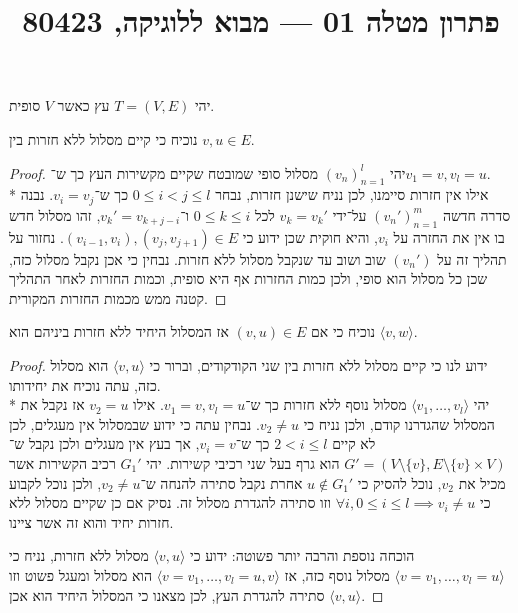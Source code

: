 
\title{פתרון מטלה 01 --- מבוא ללוגיקה, 80423}


\maketitle
\maketitleprint{}

\Question{}
יהי $T = (V, E)$ עץ כאשר $V$ סופית.

\Subquestion{}
נוכיח כי קיים מסלול ללא חזרות בין $v, u \in E$.
\begin{proof}
	יהי ${(v_n)}_{n = 1}^l$ מסלול סופי שמובטח שקיים מקשירות העץ כך ש־$v_1 = v, v_l = u$. \\*
	אילו אין חזרות סיימנו, לכן נניח שישנן חזרות, נבחר $0 \le i < j \le l$ כך ש־$v_i = v_j$.
	נבנה סדרה חדשה ${(v_n')}_{n = 1}^m$ על־ידי $v_k = v_k'$ לכל $0 \le k \le i$ ו־$v_k' = v_{k + j - i}$,
	זהו מסלול חדש בו אין את החזרה על $v_i$, והיא חוקית שכן ידוע כי $(v_{i - 1}, v_i), (v_j, v_{j + 1}) \in E$.
	נחזור על תהליך זה על $(v_n')$ שוב ושוב עד שנקבל מסלול ללא חזרות.
	נבחין כי אכן נקבל מסלול כזה, שכן כל מסלול הוא סופי, ולכן כמות החזרות אף היא סופית, וכמות החזרות לאחר התהליך קטנה ממש מכמות החזרות המקורית.
\end{proof}

\Subquestion{}
נוכיח כי אם $(v, u) \in E$ אז המסלול היחיד ללא חזרות ביניהם הוא $\langle v, w \rangle$.
\begin{proof}
	ידוע לנו כי קיים מסלול ללא חזרות בין שני הקודקודים, וברור כי $\langle v, u \rangle$ הוא מסלול כזה, עתה נוכיח את יחידותו. \\*
	יהי $\langle v_1, \dots, v_l \rangle$ מסלול נוסף ללא חזרות כך ש־$v_1 = v, v_l = u$.
	אילו $v_2 = u$ אז נקבל את המסלול שהגדרנו קודם, ולכן נניח כי $v_2 \ne u$.
	נבחין עתה כי ידוע שבמסלול אין מעגלים, לכן לא קיים $2 < i \le l$ כך ש־$v_i = v$, אך בעץ אין מעגלים ולכן נקבל ש־$G' = (V \setminus \{ v \}, E \setminus \{ v \} \times V)$ הוא גרף בעל שני רכיבי קשירות.
	יהי $G_1'$ רכיב הקשירות אשר מכיל את $v_2$, נוכל להסיק כי $u \notin G_1'$ אחרת נקבל סתירה להנחה ש־$v_2 \ne u$, ולכן נוכל לקבוע כי $\forall i, 0 \le i \le l \implies v_i \ne u$ וזו סתירה להגדרת מסלול זה.
	נסיק אם כן שקיים מסלול ללא חזרות יחיד והוא זה אשר ציינו.

	הוכחה נוספת והרבה יותר פשוטה:
	ידוע כי $\langle v, u \rangle$ מסלול ללא חזרות, נניח כי $\langle v = v_1, \dots, v_l = u \rangle$ מסלול נוסף כזה, אז $\langle v = v_1, \dots, v_l = u, v \rangle$ הוא מסלול ומעגל פשוט וזו סתירה להגדרת העץ,
	לכן מצאנו כי המסלול היחיד הוא אכן $\langle v, u \rangle$.
\end{proof}

